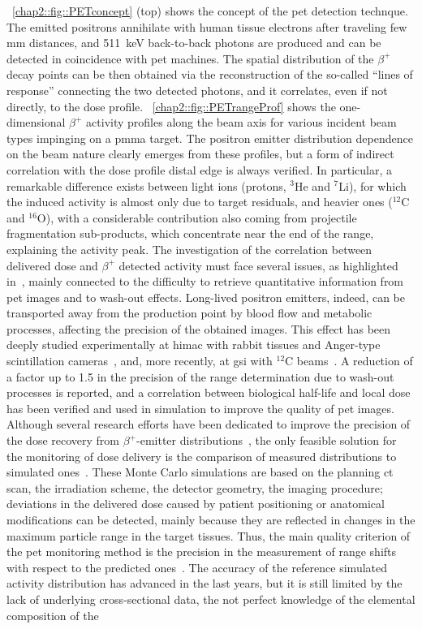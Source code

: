 \figurename~\ref{chap2::fig::PETconcept} (top) shows the concept of the \gls{pet} detection technque. The emitted positrons annihilate with human tissue electrons after traveling few mm distances, and 511~keV back-to-back photons are produced and can be detected in coincidence with \gls{pet} machines. The spatial distribution of the $\beta^+$ decay points can be then obtained via the reconstruction of the so-called \enquote{lines of response} connecting the two detected photons, and it correlates, even if not directly, to the dose profile. \figurename~\ref{chap2::fig::PETrangeProf} shows the one-dimensional $\beta^+$ activity profiles along the beam axis for various incident beam types impinging on a \gls{pmma} target. The positron emitter distribution dependence on the beam nature clearly emerges from these profiles, but a form of indirect correlation with the dose profile distal edge is always verified. In particular, a remarkable difference exists between light ions (protons, $^3$He and $^7$Li), for which the induced activity is almost only due to target residuals, and heavier ones ($^{12}$C and $^{16}$O), with a considerable contribution also coming from projectile fragmentation sub-products, which concentrate near the end of the range, explaining the activity peak. The investigation of the correlation between delivered dose and $\beta^+$ detected activity must face several issues, as highlighted in~\cite{Parodi2004}, mainly connected to the difficulty to retrieve quantitative information from \gls{pet} images and to wash-out effects. Long-lived positron emitters, indeed, can be transported away from the production point by blood flow and metabolic processes, affecting the precision of the obtained images. This effect has been deeply studied experimentally at \gls{himac} with rabbit tissues and Anger-type scintillation cameras~\parencite{Mizuno2003, Tomitani2003}, and, more recently, at \gls{gsi} with $^{12}$C beams~\parencite{Fiedler2008}. A reduction of a factor up to 1.5 in the precision of the range determination due to wash-out processes is reported, and a correlation between biological half-life and local dose has been verified and used in simulation to improve the quality of \gls{pet} images. Although several research efforts have been dedicated to improve the precision of the dose recovery from $\beta^+$-emitter distributions~\parencite{Parodi2006, Parodi2007, Parodi2010}, the only feasible solution for the monitoring of dose delivery is the comparison of measured distributions to simulated ones~\parencite{Ponish2004}. These Monte Carlo simulations are based on the planning \gls{ct} scan, the irradiation scheme, the detector geometry, the imaging procedure; deviations in the delivered dose caused by patient positioning or anatomical modifications can be detected, mainly because they are reflected in changes in the maximum particle range in the target tissues. Thus, the main quality criterion of the \gls{pet} monitoring method is the precision in the measurement of range shifts with respect to the predicted ones~\parencite{Fiedler2010}. The accuracy of the reference simulated activity distribution has advanced in the last years, but it is still limited by the lack of underlying cross-sectional data, the not perfect knowledge of the elemental composition of the 